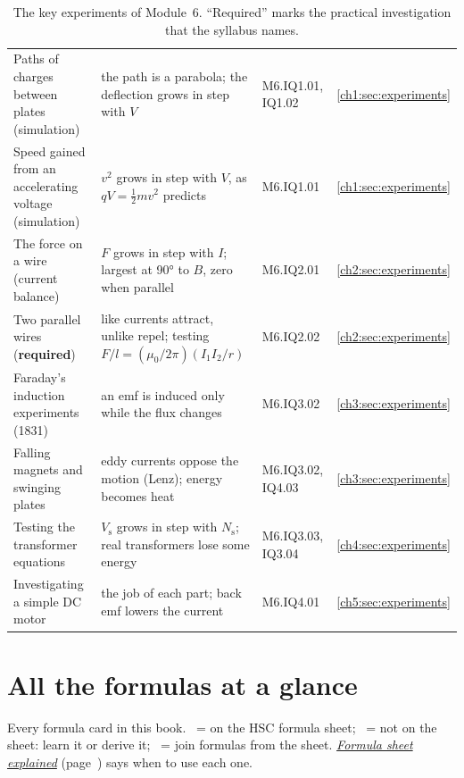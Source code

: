 \begin{table}
  \caption{The key experiments of Module~6. ``Required'' marks the practical investigation
    that the syllabus names.}\label{ov:tab:experiments}
  \centering
  \small
  \begin{tabular}{@{}L{46mm}L{56mm}L{17mm}L{17mm}@{}}
    \toprule
     &  &  & \\
    \midrule
    Paths of charges between plates (simulation)
      & the path is a parabola; the deflection grows in step with $V$
      & M6.IQ1.01, IQ1.02 & \cref{ch1:sec:experiments}\\
    Speed gained from an accelerating voltage (simulation)
      & $v^2$ grows in step with $V$, as $qV = \frac{1}{2}mv^2$ predicts
      & M6.IQ1.01 & \cref{ch1:sec:experiments}\\
    The force on a wire (current balance)
      & $F$ grows in step with $I$; largest at \ang{90} to $B$, zero when parallel
      & M6.IQ2.01 & \cref{ch2:sec:experiments}\\
    Two parallel wires (\textbf{required})
      & like currents attract, unlike repel; testing $F/l = (\mu_0/2\pi)(I_1 I_2/r)$
      & M6.IQ2.02 & \cref{ch2:sec:experiments}\\
    Faraday's induction experiments (1831)
      & an emf is induced only while the flux changes
      & M6.IQ3.02 & \cref{ch3:sec:experiments}\\
    Falling magnets and swinging plates
      & eddy currents oppose the motion (Lenz); energy becomes heat
      & M6.IQ3.02, IQ4.03 & \cref{ch3:sec:experiments}\\
    Testing the transformer equations
      & $V_\mathrm{s}$ grows in step with $N_\mathrm{s}$; real transformers lose some energy
      & M6.IQ3.03, IQ3.04 & \cref{ch4:sec:experiments}\\
    Investigating a simple DC motor
      & the job of each part; back emf lowers the current
      & M6.IQ4.01 & \cref{ch5:sec:experiments}\\
    \bottomrule
  \end{tabular}
\end{table}

\section*{All the formulas at a glance}

Every formula card in this book. \ovYes\ = on the HSC formula sheet; \ovNo\ = not on the
sheet: learn it or derive it; \ovComb\ = join formulas from the sheet.
\hyperref[fs:chap]{\emph{Formula sheet explained}} (page~\pageref{fs:chap}) says when to use
each one.

